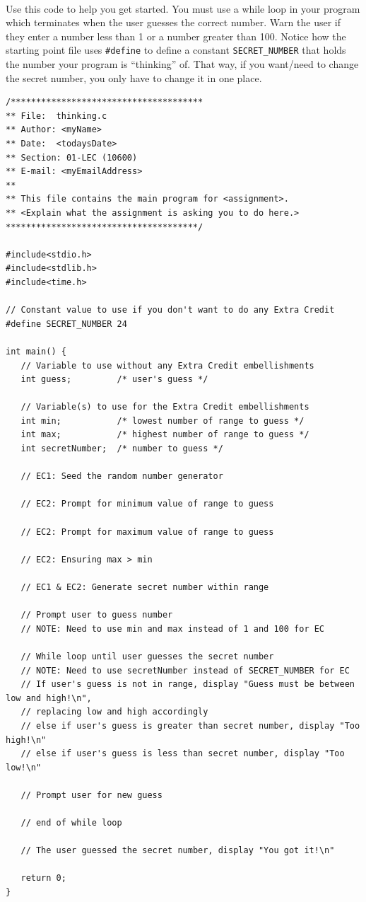 \documentclass[letter,11pt]{article}
\begin{document}
\paragraph{}Use this code to help you get started. You must use a while loop in your program which terminates when the user guesses the correct number. Warn the user if they enter a number less than 1 or a number greater than 100. Notice how the starting point file uses \texttt{\#define} to define a constant \texttt{SECRET\_NUMBER} that holds the number your program is ``thinking'' of. That way, if you want/need to change the secret number, you only have to change it in one place.
\begin{verbatim}
/**************************************
** File:  thinking.c
** Author: <myName>
** Date:  <todaysDate>
** Section: 01-LEC (10600)
** E-mail: <myEmailAddress>
**
** This file contains the main program for <assignment>.
** <Explain what the assignment is asking you to do here.>
**************************************/

#include<stdio.h>
#include<stdlib.h>
#include<time.h>

// Constant value to use if you don't want to do any Extra Credit
#define SECRET_NUMBER 24

int main() {
   // Variable to use without any Extra Credit embellishments
   int guess;         /* user's guess */

   // Variable(s) to use for the Extra Credit embellishments
   int min;           /* lowest number of range to guess */
   int max;           /* highest number of range to guess */
   int secretNumber;  /* number to guess */

   // EC1: Seed the random number generator

   // EC2: Prompt for minimum value of range to guess

   // EC2: Prompt for maximum value of range to guess
   
   // EC2: Ensuring max > min

   // EC1 & EC2: Generate secret number within range

   // Prompt user to guess number
   // NOTE: Need to use min and max instead of 1 and 100 for EC

   // While loop until user guesses the secret number
   // NOTE: Need to use secretNumber instead of SECRET_NUMBER for EC
   // If user's guess is not in range, display "Guess must be between low and high!\n",
   // replacing low and high accordingly
   // else if user's guess is greater than secret number, display "Too high!\n"
   // else if user's guess is less than secret number, display "Too low!\n"
      
   // Prompt user for new guess
      
   // end of while loop
   
   // The user guessed the secret number, display "You got it!\n"

   return 0;
}
\end{verbatim}
\end{document}

